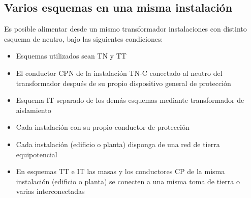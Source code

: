 \subsection{Varios esquemas en una misma instalación}
Es posible alimentar desde un mismo transformador instalaciones con
distinto esquema de neutro, bajo las siguientes condiciones:
\begin{itemize}
	\item Esquemas utilizados sean TN y TT
	\item El conductor CPN de la instalación TN-C conectado al neutro del transformador después
	de su propio dispositivo general de protección
	\item Esquema IT separado de los demás esquemas mediante transformador de aislamiento
	\item Cada instalación con su propio conductor de protección
	\item Cada instalación (edificio o planta) disponga de una red de tierra equipotencial
	\item En esquemas TT e IT las masas y los conductores CP de la misma instalación (edificio o
	planta) se conecten a una misma toma de tierra o varias interconectadas
\end{itemize}